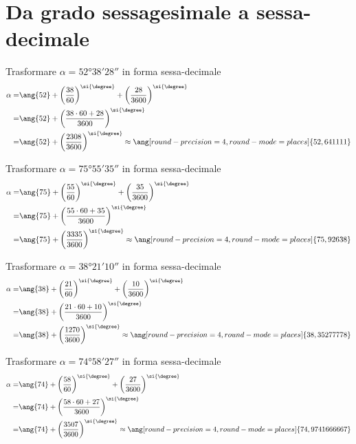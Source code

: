 \section{Da grado sessagesimale a sessa-decimale}
 \tcbstartrecording
 \begin{exercise}
Trasformare $\alpha=\ang{52;38;28}$ in forma sessa-decimale
\tcblower
\begin{align*}
\alpha=&\ang{52}+\left(\dfrac{38}{60}\right)^{\si{\degree} }+\left(\dfrac{28}{3600}\right)^{\si{\degree} }\\
=&\ang{52}+\left(\dfrac{38\cdot60+28}{3600}\right)^{\si{\degree} }\\
=&\ang{52}+\left(\dfrac{2308}{3600}\right)^{\si{\degree} }\approx\ang[round-precision=\lungarrotandamento,round-mode=places]{52,641111}
\end{align*}
\end{exercise}
 \begin{exercise}
 	Trasformare  $\alpha=\ang{75;55;35}$ in forma sessa-decimale
 	\tcblower
 	\begin{align*}
 	\alpha=&\ang{75}+\left(\dfrac{55}{60}\right)^{\si{\degree} }+\left(\dfrac{35}{3600}\right)^{\si{\degree} }\\
 	=&\ang{75}+\left(\dfrac{55\cdot60+35}{3600}\right)^{\si{\degree}}\\
 	=&\ang{75}+\left(\dfrac{3335}{3600}\right)^{\si{\degree}}\approx\ang[round-precision=\lungarrotandamento,round-mode=places]{75,92638}
 	\end{align*}
 \end{exercise}
  \begin{exercise}
  	Trasformare  $\alpha=\ang{38;21;10}$ in forma sessa-decimale
  	\tcblower
  	\begin{align*}
  	\alpha=&\ang{38}+\left(\dfrac{21}{60}\right)^{\si{\degree} }+\left(\dfrac{10}{3600}\right)^{\si{\degree} }\\
  	=&\ang{38}+\left(\dfrac{21\cdot60+10}{3600}\right)^{\si{\degree}}\\
  	=&\ang{38}+\left(\dfrac{1270}{3600}\right)^{\si{\degree}}\approx\ang[round-precision=\lungarrotandamento,round-mode=places]{38,35277778}
  	\end{align*}
  \end{exercise}
  \begin{exercise}
  	Trasformare  $\alpha=\ang{74;58;27}$ in forma sessa-decimale
  	\tcblower
  	\begin{align*}
  	\alpha=&\ang{74}+\left(\dfrac{58}{60}\right)^{\si{\degree} }+\left(\dfrac{27}{3600}\right)^{\si{\degree} }\\
  	=&\ang{74}+\left(\dfrac{58\cdot60+27}{3600}\right)^{\si{\degree}}\\
  	=&\ang{74}+\left(\dfrac{3507}{3600}\right)^{\si{\degree}}\approx\ang[round-precision=\lungarrotandamento,round-mode=places]{74,9741666667}
  	\end{align*}
  \end{exercise}
